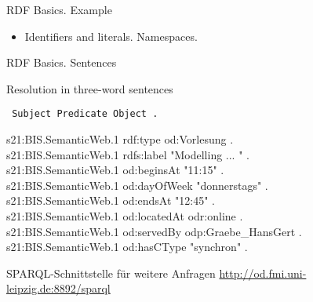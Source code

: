 \documentclass{beamer}
\def\lt{\texttt{<}}
\def\gt{\texttt{>}}
\begin{document}
\begin{frame}{RDF Basics. Example}

  {\small\tt {}}
  
  \begin{itemize}
  \item Identifiers and literals. Namespaces.
  \end{itemize}
\end{frame}
\begin{frame}{RDF Basics. Sentences}

Resolution in three-word sentences
\begin{center}\tt
  Subject Predicate Object .
\end{center}

  {\small\tt \begin{tabbing}
    s21:BIS.SemanticWeb.1 rdf:type od:Vorlesung .\\
    s21:BIS.SemanticWeb.1 rdfs:label	"Modelling ... " .\\
    s21:BIS.SemanticWeb.1 od:beginsAt	"11:15" .\\
    s21:BIS.SemanticWeb.1 od:dayOfWeek	"donnerstags" .\\
    s21:BIS.SemanticWeb.1 od:endsAt	"12:45" .\\
    s21:BIS.SemanticWeb.1 od:locatedAt	odr:online .\\
    s21:BIS.SemanticWeb.1 od:servedBy	odp:Graebe\_HansGert .\\
    s21:BIS.SemanticWeb.1 od:hasCType	"synchron" .
  \end{tabbing}}

  SPARQL-Schnittstelle für weitere Anfragen
  \url{http://od.fmi.uni-leipzig.de:8892/sparql}
\end{frame}
\end{document}

